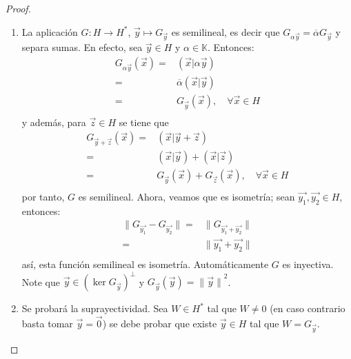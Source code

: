 \documentclass[12pt]{report}
\newcounter{it}
\theoremstyle{largebreak}
\newcommand\cf[3]{\ensuremath{#1:#2\rightarrow#3}}
\newcommand\norm[1]{\ensuremath{\|#1\|}}
\newcommand\pint[2]{\ensuremath{\left(#1\big| #2\right)}}
\newcommand\conj[1]{\ensuremath{\overline{#1}}}
\begin{document}
\begin{proof}
\begin{enumerate}
            \item La aplicación $\cf{G}{H}{H^*}$, $\vec{y}\mapsto G_{\vec{y}}$ es semilineal, es decir que $G_{\alpha\vec{y}}=\conj{\alpha}G_{\vec{y}}$ y separa sumas. En efecto, sea $\vec{y}\in H$ y $\alpha\in\mathbb{K}$. Entonces:
            \begin{equation*}
                \begin{split}
                    G_{\alpha\vec{y}}(\vec{x})=&\pint{\vec{x}}{\alpha\vec{y}}\\
                    =&\conj{\alpha} \pint{\vec{x}}{\vec{y}}\\
                    =& G_{\vec{y}}(\vec{x}),\quad\forall\vec{x}\in H \\
                \end{split}
            \end{equation*}
            y además, para $\vec{z}\in H$ se tiene que
            \begin{equation*}
                \begin{split}
                    G_{\vec{y}+\vec{z}}(\vec{x})=&\pint{\vec{x}}{\vec{y}+\vec{z}} \\
                    =&\pint{\vec{x}}{\vec{y}}+\pint{\vec{x}}{\vec{z}} \\
                    =& G_{\vec{y}}(\vec{x})+G_{\vec{z}}(\vec{x}),\quad\forall\vec{x}\in H \\
                \end{split}
            \end{equation*}
            por tanto, $G$ es semilineal. Ahora, veamos que es isometría; sean $\vec{y_1},\vec{y_2}\in H$, entonces:
            \begin{equation*}
                \begin{split}
                    \norm{G_{\vec{y_1}}-G_{\vec{y_2}}}=&\norm{G_{\vec{y_1}+\vec{y_2}}} \\
                    =& \norm{\vec{y_1}+\vec{y_2}}\\
                \end{split}
            \end{equation*}
            así, esta función semilineal es isometría. Automáticamente $G$ es inyectiva. Note que $\vec{y}\in\left(\ker G_{\vec{y}} \right)^\perp$ y $G_{\vec{y}}(\vec{y})=\norm{\vec{y}}^2$.

            \item Se probará la suprayectividad. Sea $W\in H^*$ tal que $W\neq 0$ (en caso contrario basta tomar $\vec{y}=\vec{0}$) se debe probar que existe $\vec{y}\in H$ tal que $W=G_{\vec{y}}$. 
            

\end{enumerate}
\end{proof}
\end{document}
